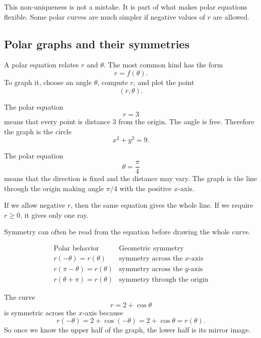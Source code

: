 This non-uniqueness is not a mistake.  It is part of what makes polar equations flexible.
Some polar curves are much simpler if negative values of \(r\) are allowed.

\subsection{Polar graphs and their symmetries}

A polar equation relates \(r\) and \(\theta\).  The most common kind has the form
\[
    r=f(\theta).
\]
To graph it, choose an angle \(\theta\), compute \(r\), and plot the point
\[
    (r,\theta).
\]

\begin{example}[The equation \(r=3\)]
The polar equation
\[
    r=3
\]
means that every point is distance \(3\) from the origin.  The angle is free.  Therefore
the graph is the circle
\[
    x^2+y^2=9.
\]
\end{example}

\begin{example}[The equation \(\theta=\pi/4\)]
The polar equation
\[
    \theta=\frac{\pi}{4}
\]
means that the direction is fixed and the distance may vary.  The graph is the line
through the origin making angle \(\pi/4\) with the positive \(x\)-axis.

If we allow negative \(r\), then the same equation gives the whole line.  If we require
\(r\ge0\), it gives only one ray.
\end{example}

Symmetry can often be read from the equation before drawing the whole curve.

\[
\begin{array}{c|c}
\text{Polar behavior} & \text{Geometric symmetry} \\ \hline
r(-\theta)=r(\theta) & \text{symmetry across the }x\text{-axis}\\[2mm]
r(\pi-\theta)=r(\theta) & \text{symmetry across the }y\text{-axis}\\[2mm]
r(\theta+\pi)=r(\theta) & \text{symmetry through the origin}
\end{array}
\]

\begin{example}
The curve
\[
    r=2+\cos\theta
\]
is symmetric across the \(x\)-axis because
\[
    r(-\theta)=2+\cos(-\theta)=2+\cos\theta=r(\theta).
\]
So once we know the upper half of the graph, the lower half is its mirror image.
\end{example}

